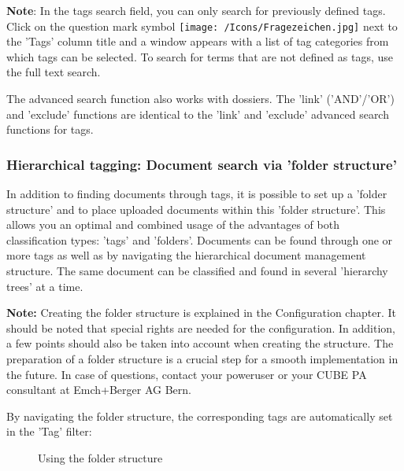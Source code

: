 \textbf{Note}: In the tags search field, you can only search for previously defined tags. Click on the question mark symbol \texttt{[image: /Icons/Fragezeichen.jpg]} next to the 'Tags' column title and a window appears with a list of tag categories from which tags can be selected. To search for terms that are not defined as tags, use the full text search.

\vspace{\baselineskip}

The advanced search function also works with dossiers. The 'link' ('AND'/'OR') and 'exclude' functions are identical to the 'link' and 'exclude' advanced search functions for tags.

\subsubsection{Hierarchical tagging: Document search via 'folder structure'}

In addition to finding documents through tags, it is possible to set up a 'folder structure' and to place uploaded documents within this 'folder structure'. This allows you an optimal and combined usage of the advantages of both classification types: 'tags' and 'folders'. Documents can be found through one or more tags as well as by navigating the hierarchical document management structure. The same document can be classified and found in several 'hierarchy trees' at a time.

\vspace{\baselineskip}

\textbf{Note:} Creating the folder structure is explained in the Configuration chapter. It should be noted that special rights are needed for the configuration. In addition, a few points should also be taken into account when creating the structure. The preparation of a folder structure is a crucial step for a smooth implementation in the future. In case of questions, contact your poweruser or your CUBE PA consultant at Emch+Berger AG Bern.

\vspace{\baselineskip}

By navigating the folder structure, the corresponding tags are automatically set in the 'Tag' filter:

\begin{figure}[H]
\caption{Using the folder structure}
\end{figure}

